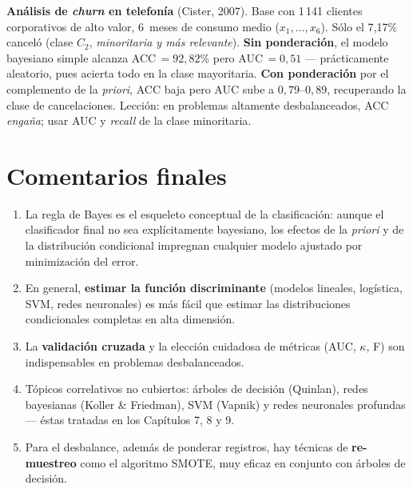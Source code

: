 \begin{aplicacao}
\textbf{Análisis de \emph{churn} en telefonía} (Cister, 2007). Base
con 1\,141 clientes corporativos de alto valor, 6~meses de consumo
medio ($x_1,\dots,x_6$). Sólo el 7{,}17\% canceló (clase $C_2$,
\emph{minoritaria y más relevante}). \textbf{Sin ponderación}, el
modelo bayesiano simple alcanza ACC$\,=92{,}82\%$ pero AUC$\,=0{,}51$
--- prácticamente aleatorio, pues acierta todo en la clase
mayoritaria. \textbf{Con ponderación} por el complemento de la
\emph{priori}, ACC baja pero AUC sube a $0{,}79$--$0{,}89$,
recuperando la clase de cancelaciones. Lección: en problemas altamente
desbalanceados, ACC \emph{engaña}; usar AUC y \emph{recall} de la
clase minoritaria.
\end{aplicacao}

\section{Comentarios finales}

\begin{enumerate}[leftmargin=1.2cm]
  \item La regla de Bayes es el esqueleto conceptual de la
        clasificación: aunque el clasificador final no sea
        explícitamente bayesiano, los efectos de la \emph{priori} y de
        la distribución condicional impregnan cualquier modelo ajustado
        por minimización del error.
  \item En general, \textbf{estimar la función discriminante} (modelos
        lineales, logística, SVM, redes neuronales) es más fácil que
        estimar las distribuciones condicionales completas en alta
        dimensión.
  \item La \textbf{validación cruzada} y la elección cuidadosa de
        métricas (AUC, $\kappa$, F) son indispensables en problemas
        desbalanceados.
  \item Tópicos correlativos no cubiertos: árboles de decisión
        (Quinlan), redes bayesianas (Koller \& Friedman), SVM (Vapnik)
        y redes neuronales profundas --- éstas tratadas en los
        Capítulos 7, 8 y 9.
  \item Para el desbalance, además de ponderar registros, hay técnicas
        de \textbf{re-muestreo} como el algoritmo SMOTE, muy eficaz
        en conjunto con árboles de decisión.
\end{enumerate}


